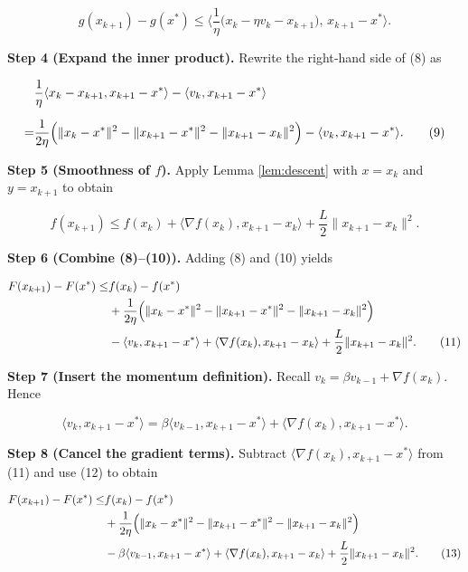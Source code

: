 \documentclass{article}
\begin{document}
\[
g(x_{k+1})-g(x^{*})\le
\Big\langle\frac{1}{\eta}\bigl(x_{k}-\eta v_{k}-x_{k+1}\bigr),\,x_{k+1}-x^{*}\Big\rangle. \tag{8}
\]

\medskip
\noindent\textbf{Step 4 (Expand the inner product).}  
Rewrite the right‑hand side of (8) as  

\[
\begin{aligned}
&\frac{1}{\eta}\langle x_{k}-x_{k+1},x_{k+1}-x^{*}\rangle
-\langle v_{k},x_{k+1}-x^{*}\rangle \\[2mm]
=&\frac{1}{2\eta}\Bigl(\|x_{k}-x^{*}\|^{2}
-\|x_{k+1}-x^{*}\|^{2}
-\|x_{k+1}-x_{k}\|^{2}\Bigr)
-\langle v_{k},x_{k+1}-x^{*}\rangle . \tag{9}
\end{aligned}
\]

\medskip
\noindent\textbf{Step 5 (Smoothness of \(f\)).}  
Apply Lemma \ref{lem:descent} with \(x=x_{k}\) and \(y=x_{k+1}\) to obtain  

\[
f(x_{k+1})\le f(x_{k})+\langle\nabla f(x_{k}),x_{k+1}-x_{k}\rangle
+\frac{L}{2}\|x_{k+1}-x_{k}\|^{2}. \tag{10}
\]

\medskip
\noindent\textbf{Step 6 (Combine (8)–(10)).}  
Adding (8) and (10) yields  

\[
\begin{aligned}
F(x_{k+1})-F(x^{*})\le &
f(x_{k})-f(x^{*}) \\
&+\frac{1}{2\eta}\Bigl(\|x_{k}-x^{*}\|^{2}
-\|x_{k+1}-x^{*}\|^{2}
-\|x_{k+1}-x_{k}\|^{2}\Bigr)\\
&-\langle v_{k},x_{k+1}-x^{*}\rangle
+\langle\nabla f(x_{k}),x_{k+1}-x_{k}\rangle
+\frac{L}{2}\|x_{k+1}-x_{k}\|^{2}. \tag{11}
\end{aligned}
\]

\medskip
\noindent\textbf{Step 7 (Insert the momentum definition).}  
Recall \(v_{k}= \beta v_{k-1}+ \nabla f(x_{k})\). Hence  

\[
\langle v_{k},x_{k+1}-x^{*}\rangle
= \beta\langle v_{k-1},x_{k+1}-x^{*}\rangle
+\langle\nabla f(x_{k}),x_{k+1}-x^{*}\rangle. \tag{12}
\]

\medskip
\noindent\textbf{Step 8 (Cancel the gradient terms).}  
Subtract \(\langle\nabla f(x_{k}),x_{k+1}-x^{*}\rangle\) from (11) and use (12) to obtain  

\[
\begin{aligned}
F(x_{k+1})-F(x^{*})\le &
f(x_{k})-f(x^{*}) \\
&+\frac{1}{2\eta}\Bigl(\|x_{k}-x^{*}\|^{2}
-\|x_{k+1}-x^{*}\|^{2}
-\|x_{k+1}-x_{k}\|^{2}\Bigr)\\
&-\beta\langle v_{k-1},x_{k+1}-x^{*}\rangle
+\langle\nabla f(x_{k}),x_{k+1}-x_{k}\rangle
+\frac{L}{2}\|x_{k+1}-x_{k}\|^{2}. \tag{13}
\end{aligned}
\]
\end{document}
